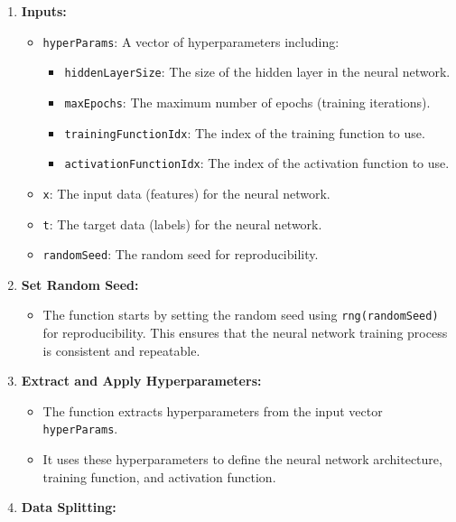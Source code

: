 \documentclass[
  super,
  review,
  3p]{elsarticle}
\providecommand{\tightlist}{%
  \setlength{\itemsep}{0pt}\setlength{\parskip}{0pt}}\usepackage{longtable,booktabs,array}
\begin{document}
\begin{enumerate}
\def\labelenumi{\arabic{enumi}.}
\tightlist
\item
  \textbf{Inputs:}

  \begin{itemize}
  \tightlist
  \item
    \texttt{hyperParams}: A vector of hyperparameters including:

    \begin{itemize}
    \tightlist
    \item
      \texttt{hiddenLayerSize}: The size of the hidden layer in the
      neural network.
    \item
      \texttt{maxEpochs}: The maximum number of epochs (training
      iterations).
    \item
      \texttt{trainingFunctionIdx}: The index of the training function
      to use.
    \item
      \texttt{activationFunctionIdx}: The index of the activation
      function to use.
    \end{itemize}
  \item
    \texttt{x}: The input data (features) for the neural network.
  \item
    \texttt{t}: The target data (labels) for the neural network.
  \item
    \texttt{randomSeed}: The random seed for reproducibility.
  \end{itemize}
\item
  \textbf{Set Random Seed:}

  \begin{itemize}
  \tightlist
  \item
    The function starts by setting the random seed using
    \texttt{rng(randomSeed)} for reproducibility. This ensures that the
    neural network training process is consistent and repeatable.
  \end{itemize}
\item
  \textbf{Extract and Apply Hyperparameters:}

  \begin{itemize}
  \tightlist
  \item
    The function extracts hyperparameters from the input vector
    \texttt{hyperParams}.
  \item
    It uses these hyperparameters to define the neural network
    architecture, training function, and activation function.
  \end{itemize}
\item
  \textbf{Data Splitting:}


\end{enumerate}
\end{document}

